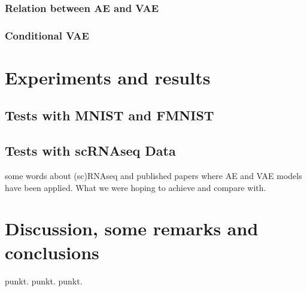 \documentclass[11pt, a4paper]{report}
\theoremstyle{plain}
\theoremstyle{definition}
\theoremstyle{remark}
\begin{document}
\subsection{Relation between AE and VAE}

\subsection{Conditional VAE}

\chapter{Experiments and results}
\section{Tests with MNIST and FMNIST}

\section{Tests with scRNAseq Data}
some words about (sc)RNAseq and published papers where 
AE and VAE models have been applied.
What we were hoping to achieve and compare with.

\chapter{Discussion, some remarks and conclusions}
punkt.
punkt.
punkt.







\printbibliography
\end{document}

